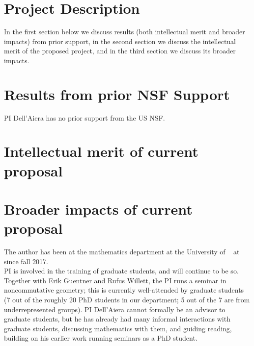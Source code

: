 \documentclass[11pt]{article}
\begin{document}
\section*{Project Description}


In the first section below we discuss results (both intellectual merit and broader impacts) from prior support, in the second section we discuss the intellectual merit of the proposed project, and in the third section we discuss its broader impacts.
 
\section{Results from prior NSF Support}

PI Dell'Aiera has no prior support from the US NSF.  

\section{Intellectual merit of current proposal}


%

\section{Broader impacts of current proposal}
  
The author has been at the mathematics department at the University of \Hawaii~ at \Manoa~ since fall 2017.\\  

PI is involved in the training of graduate students, and will continue to be so. Together with Erik Guentner and Rufus Willett, the PI runs a seminar in noncommutative geometry; this is currently well-attended by graduate students (7 out of the roughly 20 PhD students in our department; 5 out of the 7 are from underrepresented groups). PI Dell'Aiera cannot formally be an advisor to graduate students, but he has already had many informal interactions with graduate students, discussing mathematics with them, and guiding reading, building on his earlier work running seminars as a PhD student.\\
\end{document}

